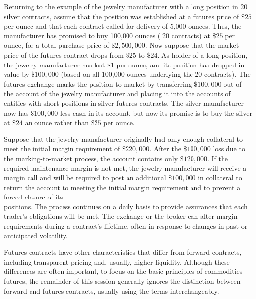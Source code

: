 \documentclass[11pt]{article}
\begin{document}
Returning to the example of the jewelry manufacturer with a long position in 20 silver contracts, assume that the position was established at a futures price of $\$ 25$ per ounce and that each contract called for delivery of 5,000 ounces. Thus, the manufacturer has promised to buy 100,000 ounces ( 20 contracts) at $\$ 25$ per ounce, for a total purchase price of $\$ 2,500,000$. Now suppose that the market price of the futures contract drops from $\$ 25$ to $\$ 24$. As holder of a long position, the jewelry manufacturer has lost $\$ 1$ per ounce, and its position has dropped in value by $\$ 100,000$ (based on all 100,000 ounces underlying the 20 contracts). The futures exchange marks the position to market by transferring $\$ 100,000$ out of the account of the jewelry manufacturer and placing it into the accounts of entities with short positions in silver futures contracts. The silver manufacturer now has $\$ 100,000$ less cash in its account, but now its promise is to buy the silver at $\$ 24$ an ounce rather than $\$ 25$ per ounce.

Suppose that the jewelry manufacturer originally had only enough collateral to meet the initial margin requirement of $\$ 220,000$. After the $\$ 100,000$ loss due to the marking-to-market process, the account contains only $\$ 120,000$. If the required maintenance margin is not met, the jewelry manufacturer will receive a margin call and will be required to post an additional $\$ 100,000$ in collateral to return the account to meeting the initial margin requirement and to prevent a forced closure of its\\
positions. The process continues on a daily basis to provide assurances that each trader's obligations will be met. The exchange or the broker can alter margin requirements during a contract's lifetime, often in response to changes in past or anticipated volatility.

Futures contracts have other characteristics that differ from forward contracts, including transparent pricing and, usually, higher liquidity. Although these differences are often important, to focus on the basic principles of commodities futures, the remainder of this session generally ignores the distinction between forward and futures contracts, usually using the terms interchangeably.
\end{document}
